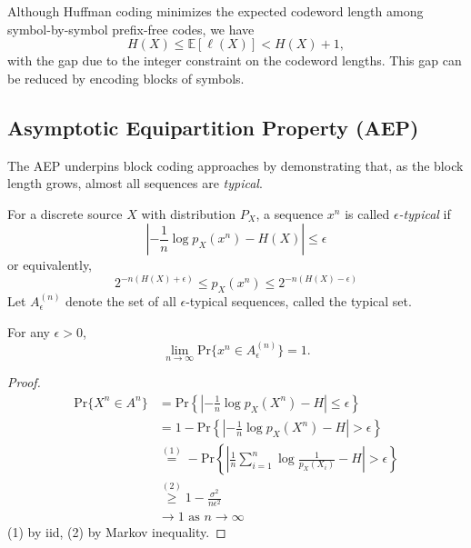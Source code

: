 Although Huffman coding minimizes the expected codeword length among symbol-by-symbol prefix-free codes, we have
\[
H(X) \le \mathbb{E}[\ell(X)] < H(X) + 1,
\]
with the gap due to the integer constraint on the codeword lengths. This gap can be reduced by encoding blocks of symbols.

\subsection{Asymptotic Equipartition Property (AEP)}
The AEP underpins block coding approaches by demonstrating that, as the block length grows, almost all sequences are \emph{typical}.

\begin{definition}
For a discrete source $X$ with distribution $P_X$, a sequence $x^n$ is called \emph{$\epsilon$-typical} if
\[
\left|-\frac{1}{n}\log p_X(x^n)-H(X)\right|\le \epsilon
\]
or equivalently, 
\[
2^{-n(H(X)+\epsilon)}\leq p_X(x^n) \leq 2^{-n(H(X)-\epsilon)}
\]
Let $A_{\epsilon}^{(n)}$ denote the set of all $\epsilon$-typical sequences, called the typical set.
\end{definition}

\begin{theorem}[AEP]
For any $\epsilon > 0$,
\[
\lim_{n\to\infty} \text{Pr}\{x^n\in A_{\epsilon}^{(n)}\} = 1.
\]
\end{theorem}
\begin{proof}
\[
\begin{aligned}
\text{Pr}\{X^n \in A^n\} 
&= \text{Pr}\left\{ \left| -\frac{1}{n}\log p_X(X^n) - H \right| \leq \epsilon \right\} \\
&= 1 - \text{Pr}\left\{ \left| -\frac{1}{n}\log p_X(X^n) - H \right| > \epsilon \right\} \\
&\stackrel{(1)}{=} - \text{Pr}\left\{ \left|\frac{1}{n}\sum_{i=1}^{n}\log\frac{1}{p_X(X_i)} - H\right| > \epsilon \right\} \\
&\stackrel{(2)}{\geq} 1 - \frac{\sigma^2}{n\epsilon^2} \\
&\to 1 \text{ as } n \to \infty
\end{aligned}
\]
(1) by iid, (2) by Markov inequality.
\end{proof}


